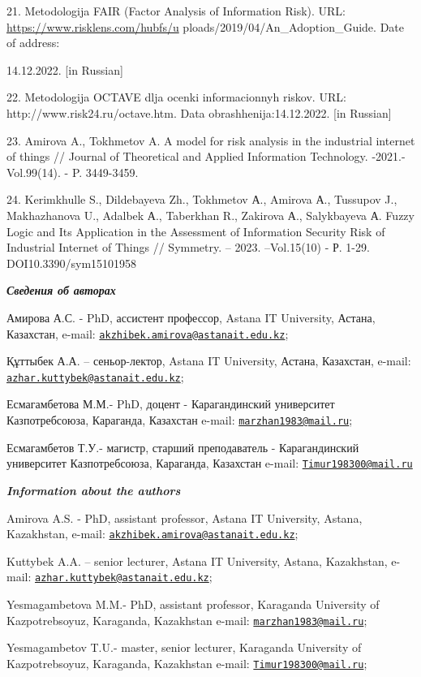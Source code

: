 \begin{references}
21. Metodologija FAIR (Factor Analysis of Information Risk). URL:
\url{https://www.risklens.com/hubfs/u}
ploads/2019/04/An\_Adoption\_Guide. Date of address:

14.12.2022. {[}in Russian{]}

22. Metodologija OCTAVE dlja ocenki informacionnyh riskov. URL:
http://www.risk24.ru/octave.htm. Data obrashhenija:14.12.2022. {[}in
Russian{]}

23. Amirova A., Tokhmetov A. A model for risk analysis in the industrial
internet of things // Journal of Theoretical and Applied Information
Technology. -2021.- Vol.99(14). - P. 3449-3459.

24. Kerimkhulle S., Dildebayeva Zh., Tokhmetov А., Amirova А., Tussupov
J., Makhazhanova U., Adalbek А., Taberkhan R., Zakirova А., Salykbayeva
А. Fuzzy Logic and Its Application in the Assessment of Information
Security Risk of Industrial Internet of Things // Symmetry. -- 2023.
--Vol.15(10) - Р. 1-29. DOI10.3390/sym15101958
\end{references}

\begin{authorinfo}
\emph{{\bfseries Сведения об авторах}}

Амирова А.С. - PhD, ассистент профессор, Astana IT University, Астана,
Казахстан, e-mail:
\href{mailto:akzhibek.amirova@astanait.edu.kz}{\nolinkurl{akzhibek.amirova@astanait.edu.kz}};

Құттыбек А.А. -- сеньор-лектор, Astana IT University, Астана, Казахстан,
e-mail:
\href{mailto:azhar.kuttybek@astanait.edu.kz}{\nolinkurl{azhar.kuttybek@astanait.edu.kz}};

Есмагамбетова М.М.- PhD, доцент - Карагандинский университет
Казпотребсоюза, Караганда, Казахстан e-mail:
\href{mailto:marzhan1983@mail.ru}{\nolinkurl{marzhan1983@mail.ru}};

Есмагамбетов Т.У.- магистр, старший преподаватель - Карагандинский
университет Казпотребсоюза, Караганда, Казахстан e-mail:
\href{mailto:Timur198300@mail.ru}{\nolinkurl{Timur198300@mail.ru}}

\emph{{\bfseries Information about the authors}}

Amirova A.S. - PhD, assistant professor, Astana IT University, Astana,
Kazakhstan, e-mail:
\href{mailto:akzhibek.amirova@astanait.edu.kz}{\nolinkurl{akzhibek.amirova@astanait.edu.kz}};

Kuttybek A.A. -- senior lecturer, Astana IT University, Astana,
Kazakhstan, e-mail:
\href{mailto:azhar.kuttybek@astanait.edu.kz}{\nolinkurl{azhar.kuttybek@astanait.edu.kz}};

Yesmagambetova M.M.- PhD, assistant professor, Karaganda University of
Kazpotrebsoyuz, Karaganda, Kazakhstan e-mail:
\href{mailto:marzhan1983@mail.ru}{\nolinkurl{marzhan1983@mail.ru}};

Yesmagambetov T.U.- master, senior lecturer, Karaganda University of
Kazpotrebsoyuz, Karaganda, Kazakhstan e-mail:
\href{mailto:Timur198300@mail.ru}{\nolinkurl{Timur198300@mail.ru}};
\end{authorinfo}
